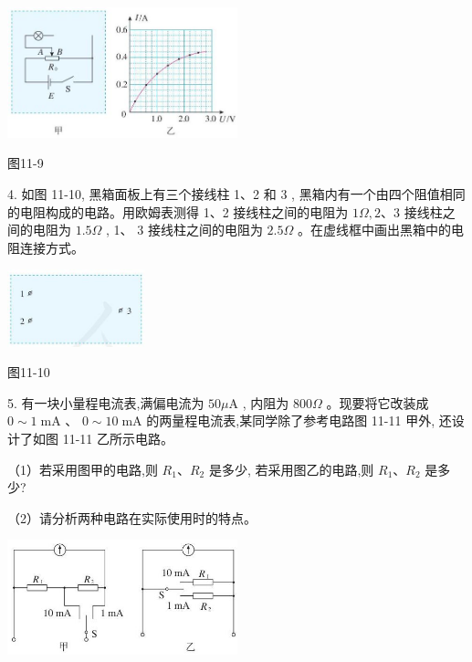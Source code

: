 \documentclass[10pt]{article}
\begin{document}
\begin{center}
\includegraphics[max width=0.5\textwidth]{images/01911d5f-8e38-70c0-b5b8-2b399bd115b6_82_543746.jpg}
\end{center}

图11-9

4. 如图 11-10, 黑箱面板上有三个接线柱 1、2 和 3 , 黑箱内有一个由四个阻值相同的电阻构成的电路。用欧姆表测得 1、2 接线柱之间的电阻为 \({1\Omega },2\text{、}3\) 接线柱之间的电阻为 \({1.5\Omega }\) , 1、 3 接线柱之间的电阻为 \({2.5\Omega }\) 。在虚线框中画出黑箱中的电阻连接方式。

\begin{center}
\includegraphics[max width=0.3\textwidth]{images/01911d5f-8e38-70c0-b5b8-2b399bd115b6_82_775030.jpg}
\end{center}

图11-10

5. 有一块小量程电流表,满偏电流为 \({50\mu }\mathrm{A}\) , 内阻为 \({800\Omega }\) 。现要将它改装成 \(0 \sim 1\mathrm{\;{mA}}\) 、 \(0 \sim {10}\mathrm{\;{mA}}\) 的两量程电流表,某同学除了参考电路图 11-11 甲外, 还设计了如图 11-11 乙所示电路。

（1）若采用图甲的电路,则 \({R}_{1}\text{、}{R}_{2}\) 是多少, 若采用图乙的电路,则 \({R}_{1}\text{、}{R}_{2}\) 是多少?

（2）请分析两种电路在实际使用时的特点。

\begin{center}
\includegraphics[max width=0.5\textwidth]{images/01911d5f-8e38-70c0-b5b8-2b399bd115b6_82_285543.jpg}
\end{center}
\end{document}
